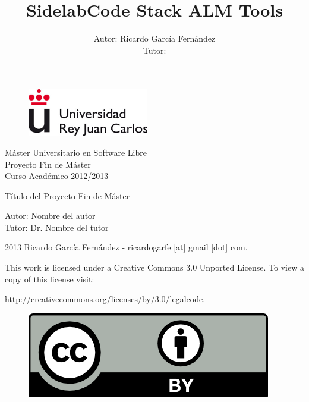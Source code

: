 \documentclass[a4paper, 12pt]{book}
\title{\textbf{SidelabCode Stack ALM Tools}}
\author{Autor: Ricardo Garc\'ia Fern\'andez
\\Tutor: }
\begin{document}
\renewcommand{\refname}{Bibliograf\'ia}  %
\renewcommand{\appendixname}{Ap\'endice}

\begin{titlepage}
\begin{center}

\begin{figure}[h]
    \begin{center}
        \includegraphics{urjc}
        \label{fig:urjc}
    \end{center}
\end{figure}

\begin{center}
\large
M\'aster Universitario en Software Libre
\\ Proyecto Fin de M\'aster
\\Curso Acad\'emico 2012/2013
\end{center}

\vspace{2cm}

\begin{center}

\LARGE
Título del Proyecto Fin de Máster

\large
Autor: Nombre del autor \\
Tutor: Dr. Nombre del tutor
\end{center}

\vfill

\begin{flushright}
\small
    2013 Ricardo Garc\'ia Fern\'andez - ricardogarfe [at] gmail [dot] com.

    This work is licensed under a Creative Commons 3.0 Unported License.
    To view a copy of this license visit:
 
    \url{http://creativecommons.org/licenses/by/3.0/legalcode}.
\end{flushright}

\begin{figure}[h]
    \begin{flushright}	
        \includegraphics{by}
        \label{fig:by}
    \end{flushright}
\end{figure}

\end{center}
\end{titlepage}
\end{document}
